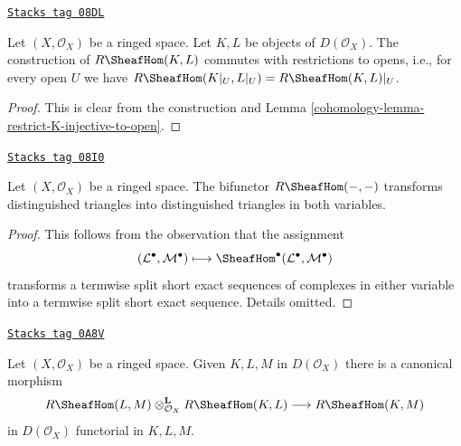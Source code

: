 \begin{lemma}
\label{cohomology-lemma-restriction-RHom-to-U}
\href{https://stacks.math.columbia.edu/tag/08DL}{\texttt{Stacks tag 08DL}}

Let $(X, \mathcal{O}_X)$ be a ringed space. Let $K, L$ be objects
of $D(\mathcal{O}_X)$. The construction of $R\SheafHom(K, L)$
commutes with restrictions to opens, i.e.,
for every open $U$ we have
$R\SheafHom(K|_U, L|_U) = R\SheafHom(K, L)|_U$.
\end{lemma}

\begin{proof}

This is clear from the construction and
Lemma \ref{cohomology-lemma-restrict-K-injective-to-open}.
\end{proof}

\begin{lemma}
\label{cohomology-lemma-RHom-triangulated}
\href{https://stacks.math.columbia.edu/tag/08I0}{\texttt{Stacks tag 08I0}}

Let $(X, \mathcal{O}_X)$ be a ringed space. The bifunctor $R\SheafHom(- , -)$
transforms distinguished triangles into distinguished triangles in both
variables.
\end{lemma}

\begin{proof}
This follows from the observation that the assignment
$$
(\mathcal{L}^\bullet, \mathcal{M}^\bullet) \longmapsto
\SheafHom^\bullet(\mathcal{L}^\bullet, \mathcal{M}^\bullet)
$$
transforms a termwise split short exact sequences of complexes in either
variable into a termwise split short exact sequence. Details omitted.
\end{proof}

\begin{lemma}
\label{cohomology-lemma-internal-hom-composition}
\href{https://stacks.math.columbia.edu/tag/0A8V}{\texttt{Stacks tag 0A8V}}

Let $(X, \mathcal{O}_X)$ be a ringed space. Given $K, L, M$ in
$D(\mathcal{O}_X)$ there is a canonical morphism
$$
R\SheafHom(L, M) \otimes_{\mathcal{O}_X}^\mathbf{L} R\SheafHom(K, L)
\longrightarrow R\SheafHom(K, M)
$$
in $D(\mathcal{O}_X)$ functorial in $K, L, M$.
\end{lemma}

